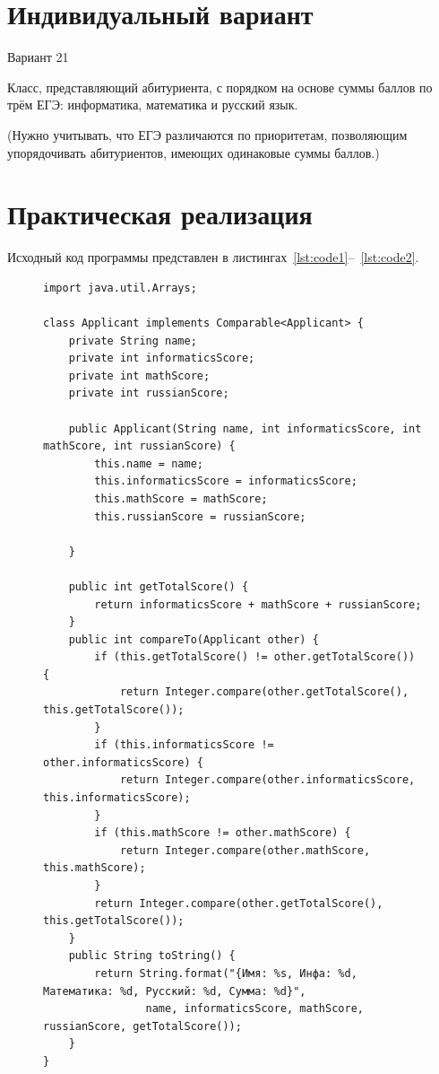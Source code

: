 \documentclass[a4paper, 14pt]{extarticle}
\begin{document}
\section{Индивидуальный вариант}
\par
Вариант 21
\par 
Класс, представляющий абитуриента, с порядком на основе суммы баллов
по трём ЕГЭ: информатика, математика и русский язык. 
\par
(Нужно
учитывать, что ЕГЭ различаются по приоритетам, позволяющим
упорядочивать абитуриентов, имеющих одинаковые суммы баллов.)


\section {Практическая реализация}
Исходный код программы представлен в листингах~\ref{lst:code1}--~\ref{lst:code2}.
\begin{figure}[!htb]
\begin{lstlisting}[language={},caption={Основной класс для варинта 21 (IntSet)},label={lst:code1}]
import java.util.Arrays;

class Applicant implements Comparable<Applicant> {
    private String name;
    private int informaticsScore;
    private int mathScore;
    private int russianScore;

    public Applicant(String name, int informaticsScore, int mathScore, int russianScore) {
        this.name = name;
        this.informaticsScore = informaticsScore;
        this.mathScore = mathScore;
        this.russianScore = russianScore;

    }

    public int getTotalScore() {
        return informaticsScore + mathScore + russianScore;
    }
    public int compareTo(Applicant other) {
        if (this.getTotalScore() != other.getTotalScore()) {
            return Integer.compare(other.getTotalScore(), this.getTotalScore());
        }
        if (this.informaticsScore != other.informaticsScore) {
            return Integer.compare(other.informaticsScore, this.informaticsScore);
        }
        if (this.mathScore != other.mathScore) {
            return Integer.compare(other.mathScore, this.mathScore);
        }
        return Integer.compare(other.getTotalScore(), this.getTotalScore());
    }
    public String toString() {
        return String.format("{Имя: %s, Инфа: %d, Математика: %d, Русский: %d, Сумма: %d}",
                name, informaticsScore, mathScore, russianScore, getTotalScore());
    }
}


\end{lstlisting}
\end{figure}
\end{document}
